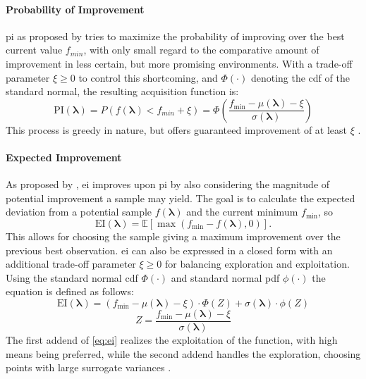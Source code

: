 \paragraph{Probability of Improvement}
\gls{pi} as proposed by \citet{kushner1964new} tries to maximize the probability of improving over the best current value $f_{min}$, with only small regard to the comparative amount of improvement in less certain, but more promising environments. With a trade-off parameter $\xi \geq 0$ to control this shortcoming, and $\Phi(\cdot)$ denoting the  \gls{cdf} of the standard normal, the resulting acquisition function is:
\begin{equation}
	\text{PI}(\mathbf{\lambda}) = P(f(\mathbf{\lambda}) < f_{min} + \xi)  
	= \Phi \left(  \frac{f_\text{min} - \mu(\mathbf{\lambda}) - \xi}{\sigma(\mathbf{\lambda})} \right) 
\end{equation}
This process is greedy in nature, but offers guaranteed improvement of at least $\xi$ \cite{brochu2010tutorial}.

\paragraph{Expected Improvement}
As proposed by \citet{jones1998efficient}, \gls{ei} improves upon \gls{pi} by also considering the magnitude of potential improvement a sample may yield. The goal is to calculate the expected deviation from a potential sample $f(\mathbf{\lambda})$ and the current minimum $f_\text{min}$, so
\begin{equation}
	\text{EI}(\mathbf{\lambda}) = \mathbb{E}[\max(f_\text{min}-f(\mathbf{\lambda}),0)].
\end{equation}
This allows for choosing the sample giving a maximum improvement over the previous best observation.
\gls{ei} can also be expressed in a closed form with an additional trade-off parameter $\xi \geq 0$ for balancing exploration and exploitation. Using the standard normal \gls{cdf} $\Phi(\cdot)$ and standard normal \gls{pdf} $\phi(\cdot)$ the equation is defined as follows:
\begin{equation}
	\label{eq:ei}
	\text{EI}(\mathbf{\lambda}) = (f_\text{min} - \mu(\mathbf{\lambda}) - \xi) \cdot \Phi(Z)+\sigma(\mathbf{\lambda})\cdot \phi(Z) 
\end{equation} 
$$
Z =  \frac{f_\text{min} - \mu(\mathbf{\lambda}) - \xi}{\sigma(\mathbf{\lambda})} 
$$
The first addend of \cref{eq:ei} realizes the exploitation of the function, with high means being preferred, while the second addend handles the exploration, choosing points with large surrogate variances \cite{brochu2010tutorial}.


